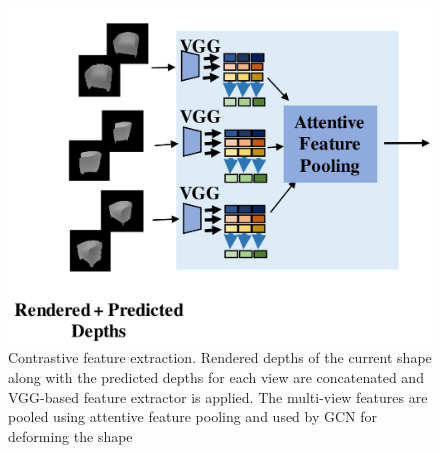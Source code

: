 
\begin{figure}[h!]
    \begin{center}
        \includegraphics[width=\linewidth]{imgs/contrastive_feature_extractor.png}
    \end{center}
    \vspace{-4mm}
        \caption{Contrastive feature extraction. Rendered depths of the current shape along with the predicted depths for each view are concatenated and VGG-based feature extractor is applied. The multi-view features are pooled using attentive feature pooling and used by GCN for deforming the shape}
        \vspace{-4mm}
        \label{fig:failure_cases}
\end{figure}

